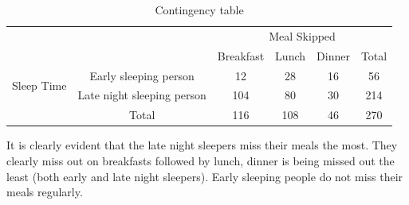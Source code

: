 \documentclass{article}
\begin{document}
\pagebreak

\begin{table}[H]
\centering
\caption{Contingency table }
\label{tab:contingency}
\begin{tabular}{|c|c|c|c|c|c|}
\hline
\multicolumn{2}{|c|}{\multirow{2}{*}{}} & \multicolumn{4}{c|}{Meal Skipped} \\
\cline{3-6}
\multicolumn{2}{|c|}{} & Breakfast & Lunch &Dinner &Total \\
\hline
\multirow{2}{*}{Sleep Time} & Early sleeping person & 12 & 28 &16 &56 \\
\cline{2-6}
& Late night sleeping person & 104 & 80 & 30 &214 \\
\hline
&\multicolumn{1}{c|}{Total} & 116 & 108 & 46 & 270\\
\hline
\end{tabular}
\end{table} 

It is clearly evident that the late night sleepers miss their meals the most. They clearly miss out on breakfasts followed by lunch, dinner is being missed out the least (both early and late night sleepers). Early sleeping people do not miss their meals regularly.\\\\\\\\
\end{document}
